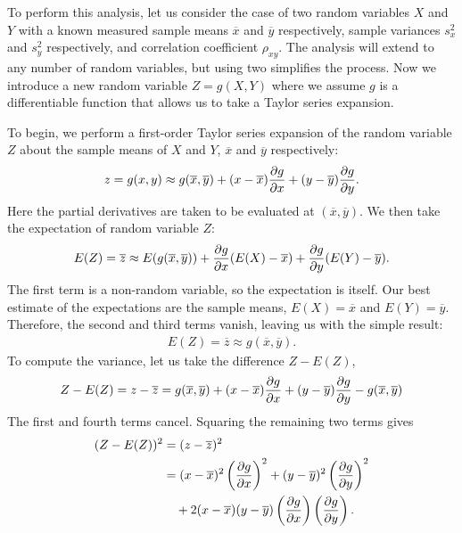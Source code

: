 To perform this analysis, let us consider the case of two random variables $X$ and $Y$ with a known measured sample means $\overline{x}$ and $\overline{y}$ respectively, sample variances $s_x^2$ and $s_y^2$ respectively, and correlation coefficient $\rho_{xy}$. The analysis will extend to any number of random variables, but using two simplifies the process. Now we introduce a new random variable $Z = g(X,Y)$ where we assume $g$ is a differentiable function that allows us to take a Taylor series expansion.

To begin, we perform a first-order Taylor series expansion of the random variable $Z$ about the sample means of $X$ and $Y$, $\overline{x}$ and $\overline{y}$ respectively:
\begin{align}
  z = g(x,y) \approx g(\overline{x},\overline{y}) + ( x - \overline{x} ) \frac{ \partial {g} }{ \partial {x} } + ( y - \overline{y} ) \frac{ \partial {g} }{ \partial {y} } .
\end{align}
Here the partial derivatives are taken to be evaluated at $(\overline{x},\overline{y})$. We then take the expectation of random variable $Z$:
\begin{align}
  E(Z) = \overline{z} \approx E( g(\overline{x},\overline{y}) ) + \frac{ \partial {g} }{ \partial {x} } ( E(X) - \overline{x} ) + \frac{ \partial {g} }{ \partial {y} } ( E(Y) - \overline{y} ) .
\end{align}
The first term is a non-random variable, so the expectation is itself. Our best estimate of the expectations are the sample means, $E(X) = \overline{x}$ and $E(Y) = \overline{y}$. Therefore, the second and third terms vanish, leaving us with the simple result:
\begin{align}
  E(Z) = \overline{z} \approx g(\overline{x},\overline{y}) .
\end{align}
To compute the variance, let us take the difference $Z - E(Z)$,
\begin{align}
  Z - E(Z) = z - \overline{z} = g(\overline{x},\overline{y}) + ( x - \overline{x} ) \frac{ \partial {g} }{ \partial {x} } + ( y - \overline{y} ) \frac{ \partial {g} }{ \partial {y} } - g(\overline{x},\overline{y})
\end{align}
The first and fourth terms cancel. Squaring the remaining two terms gives
\begin{align}
  ( Z - E(Z) )^2 &= ( z - \overline{z} )^2 \nonumber \\
  &= ( x - \overline{x} )^2 \left( \frac{ \partial {g} }{ \partial {x} } \right)^2 + ( y - \overline{y} )^2 \left( \frac{ \partial {g} }{ \partial {y} } \right)^2 \nonumber \\* 
  &\quad + 2 ( x - \overline{x} ) ( y - \overline{y} ) \left( \frac{ \partial {g} }{ \partial {x} } \right) \left( \frac{ \partial {g} }{ \partial {y} } \right) .
\end{align}
